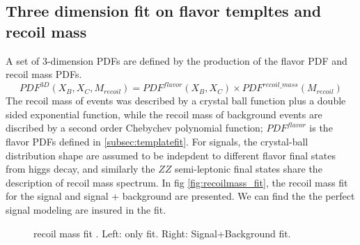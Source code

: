 \subsection{Three dimension fit on flavor templtes and recoil mass}

\label{subsec:3D_fit}
A set of 3-dimension PDFs are defined by the production of the flavor PDF and recoil mass PDFs. 
\begin{equation}
PDF^{3D}(X_B,X_C,M_{recoil}) = PDF^{flavor}(X_B,X_C)\times PDF^{recoil\_mass}(M_{recoil})
\end{equation}
The recoil mass of \mmh events was described by a crystal ball function plus a double sided exponential function, while the recoil mass of background events are discribed by a second order Chebychev polynomial function; $PDF^{flavor}$ is the flavor PDFs defined in 
 \ref{subsec:templatefit}. 
 For signals, the crystal-ball distribution shape are assumed to be indepdent to different flavor final states from higgs decay, 
 and similarly the $ZZ$ semi-leptonic final states share the description of recoil mass spectrum. In fig \ref{fig:recoilmass_fit}, the recoil mass fit for the signal 
 and signal + background are presented. We can find the the perfect signal modeling are insured in the fit.\par
 \begin{figure}
 \label{fig: recoilmass_fit}
 \centering 
\caption{ \mupair recoil mass fit . Left: \mmh only fit. Right: Signal+Background fit.}
 \end{figure}


